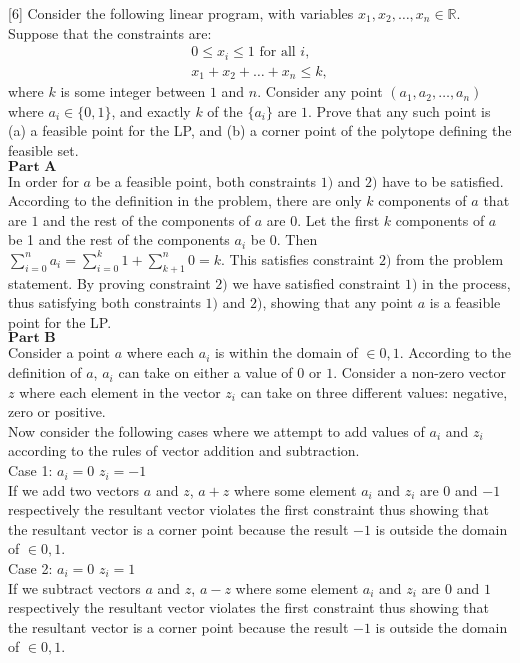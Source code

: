 \documentclass[addpoints, 11pt]{exam}
\begin{document}
\begin{questions}
  [6]
  Consider the following linear program, with variables $x_1, x_2, \dots, x_n \in \mathbb{R}$. Suppose that the constraints are:
  \begin{align*}
    0 \le x_i \le 1 \text{ for all $i$}, \\
    x_1 + x_2 + \dots + x_n \le k,
  \end{align*}
  where $k$ is some integer between $1$ and $n$. Consider any point $(a_1, a_2, \dots, a_n)$ where $a_i \in \{0,1\}$, and exactly $k$ of the $\{a_i\}$ are $1$. Prove that any such point is (a) a feasible point for the LP, and (b) a corner point of the polytope defining the feasible set. \\
  $\textbf{Part A}$ \\
  In order for $a$ be a feasible point, both constraints $1)$ and $2)$ have to be satisfied. According to the definition in the problem, there are only $k$ components of $a$ that are $1$ and the rest of the components of $a$ are $0$.
  Let the first $k$ components of $a$ be 1 and the rest of the components $a_i$ be 0. Then $\sum_{i=0}^{n}a_i = \sum_{i=0}^{k}1 + \sum_{k + 1}^{n} 0 = k$. This satisfies constraint $2)$ from the problem statement.
  By proving constraint $2)$ we have satisfied constraint $1)$ in the process, thus satisfying both constraints $1)$ and $2)$, showing that any point $a$ is a feasible point for the LP. \\

  $\textbf{Part B}$ \\
  Consider a point $a$ where each $a_i$ is within the domain of $\in{0, 1}$. According to the definition of $a$, $a_i$ can take on either a value
  of $0$ or $1$. Consider a non-zero vector $z$ where each element in the vector $z_i$ can take on three different values: negative, zero or positive. \\

  Now consider the following cases where we attempt to add values of $a_i$ and $z_i$ according to the rules of vector addition and subtraction. \\
  Case 1: $a_i = 0$ $z_i = -1$ \\
  If we add two vectors $a$ and $z$, $a + z$ where some element $a_i$ and $z_i$ are $0$ and $-1$ respectively the resultant vector violates the first constraint
  thus showing that the resultant vector is a corner point because the result $-1$ is outside the domain of $\in 0, 1$. \\

  Case 2: $a_i = 0$ $z_i = 1$ \\
  If we subtract vectors $a$ and $z$, $a - z$ where some element $a_i$ and $z_i$ are $0$ and $1$ respectively the resultant vector violates the first constraint
  thus showing that the resultant vector is a corner point because the result $-1$ is outside the domain of $\in 0, 1$. \\


\end{questions}
\end{document}
